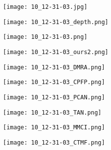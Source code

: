 \documentclass[runningheads]{llncs}
\begin{document}
\begin{figure}[t]
	\begin{subfigure}[t]{1.13cm}
		\centering
		\texttt{[image: 10\_12-31-03.jpg]}
	\end{subfigure}
	\begin{subfigure}[t]{1.13cm}
		\centering
		\texttt{[image: 10\_12-31-03\_depth.png]}
	\end{subfigure}
	\begin{subfigure}[t]{1.13cm}
		\centering
		\texttt{[image: 10\_12-31-03.png]}
	\end{subfigure}
	\begin{subfigure}[t]{1.13cm}
		\centering
		\texttt{[image: 10\_12-31-03\_ours2.png]}
	\end{subfigure}
	\begin{subfigure}[t]{1.13cm}
		\centering
		\texttt{[image: 10\_12-31-03\_DMRA.png]}
	\end{subfigure}
	\begin{subfigure}[t]{1.13cm}
		\centering
		\texttt{[image: 10\_12-31-03\_CPFP.png]}
	\end{subfigure}
	\begin{subfigure}[t]{1.13cm}
		\centering
		\texttt{[image: 10\_12-31-03\_PCAN.png]}
	\end{subfigure}
	\begin{subfigure}[t]{1.13cm}
		\centering
		\texttt{[image: 10\_12-31-03\_TAN.png]}
	\end{subfigure}
	\begin{subfigure}[t]{1.13cm}
		\centering
		\texttt{[image: 10\_12-31-03\_MMCI.png]}
	\end{subfigure}
	\begin{subfigure}[t]{1.13cm}
		\centering
		\texttt{[image: 10\_12-31-03\_CTMF.png]}
	\end{subfigure}
	
	\vspace{1pt}
	

\end{figure}
\end{document}
